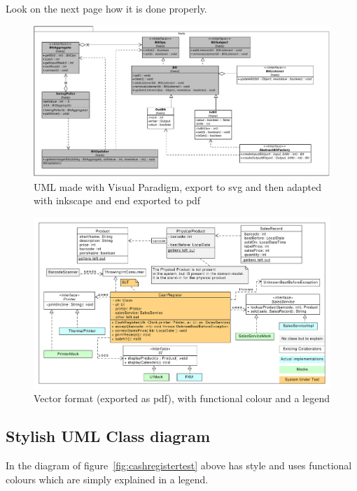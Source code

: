 Look on the next page how it is done properly.
\clearpage
\begin{figure}
  \includegraphics[width=\linewidth]{images/HWIO.pdf}
	\caption{UML made with Visual Paradigm, export to svg and then adapted with inkscape and end exported to pdf}
\end{figure}

\begin{figure}[htbp]
  \includegraphics[width=\linewidth]{images/perishablesales.pdf}
  \caption{\label{fig:cashregistertest}Vector format (exported as pdf), with functional colour and a legend}
\end{figure}


\subsection{Stylish UML Class diagram}
\label{sec:stylish}
In the diagram of figure~\vref{fig:cashregistertest} above has style and uses functional colours which are simply explained in a legend.

